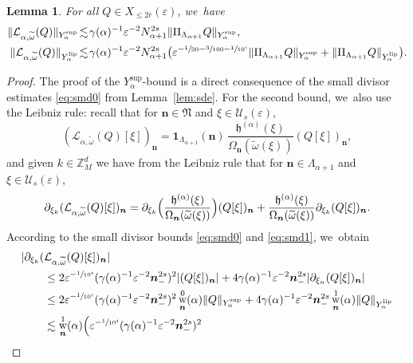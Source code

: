 \documentclass[JEP,XML,SOM,Unicode,published]{cedram}
\DeclareMathOperator{\rw}{w}
\theoremstyle{plain}
\newtheorem{lemma}[theorem]{Lemma}
\theoremstyle{definition}
\newcommand{\nb}{{\boldsymbol n}}
\newcommand{\Nb}{{\boldsymbol{\mathfrak{N}}}}
\newcommand{\Z}{\mathbb{Z}}
\newcommand{\1}{\mathbf{1}}
\newcommand{\Ysup}[1]{Y_{#1}^{\mathrm{sup}}}
\newcommand{\Ylip}[1]{Y_{#1}^{\mathrm{lip}}}
\let\epsilon\varepsilon
\begin{document}
\begin{lemma}
\label{lem:23}
For all $Q\in X_{\leq2\overline{r}}(\epsilon)$, we~have
\begin{align*}
\|\mathcal{L}_{\alpha,\widetilde{\omega}}(Q)\|_{\Ysup{\alpha}}
&\!\lesssim\! \gamma(\alpha)^{-1}\epsilon^{-2}N_{\alpha+1}^{2s}\|\Pi_{\Lambda_{\alpha+1}}Q\|_{\Ysup{\alpha}},\\
\|\mathcal{L}_{\alpha,\widetilde{\omega}}(Q)\|_{\Ylip{\alpha}}
&\!\lesssim\!
\gamma(\alpha)^{-1}
\epsilon^{-2}N_{\alpha+1}^{2s}
\bigl(
\epsilon^{-\sfrac{1}{30}-\sfrac{3}{100}-\sfrac{1}{10^{4}}}\|\Pi_{\Lambda_{\alpha+1}}Q\|_{\Ysup{\alpha}}
+
\|\Pi_{\Lambda_{\alpha+1}}Q\|_{\Ylip{\alpha}}
\bigr).
\end{align*}
\end{lemma}

\begin{proof}
The proof of the $\Ysup{\alpha}$-bound is a direct consequence of the small divisor estimates \eqref{eq:smd0} from Lemma~\ref{lem:sde}. For the second bound, we~also use the Leibniz rule: recall that for $\nb\in\Nb$ and $\xi\in\mathcal{U}_{s}(\epsilon)$,
\[
(
\mathcal{L}_{\alpha,\widetilde{\omega}}(Q)[\xi]
)_{\nb}
=
\mathbf{1}_{\Lambda_{\alpha+1}}(\nb)\,\frac{\mathfrak{h}^{(\alpha)}(\xi)}{\Omega_{\nb}(\widetilde{\omega}(\xi))}(Q[\xi])_{\nb},
\]
and given $k\in\Z_{M}^{d}$ we have from the Leibniz rule that for $\nb\in\Lambda_{\alpha+1}$ and $\xi\in\mathcal{U}_{s}(\epsilon)$,
\[
\partial_{\xi_{k}}(
\mathcal{L}_{\alpha,\widetilde{\omega}}(Q)[\xi]
)_{\nb}
=
\partial_{\xi_{k}}\Bigl(\frac{\mathfrak{h}^{(\alpha)}(\xi)}{\Omega_{\nb}(\widetilde{\omega}(\xi))}\Bigr)(Q[\xi])_{\nb}
+
\frac{\mathfrak{h}^{(\alpha)}(\xi)}{\Omega_{\nb}(\widetilde{\omega}(\xi))}
\partial_{\xi_{k}}(Q[\xi])_{\nb}.
\]
According to the small divisor bounds \eqref{eq:smd0} and \eqref{eq:smd1}, we~obtain
\begin{align*}
|\partial_{\xi_{k}}(&
\mathcal{L}_{\alpha,\widetilde{\omega}}(Q)[\xi]
)_{\nb}
| \\
&\leq
2\epsilon^{-\sfrac{1}{10^{4}}}(\gamma(\alpha)^{-1}\epsilon^{-2}\nb_{-}^{2s})^{2}
|(Q[\xi])_{\nb}|
+
4\gamma(\alpha)^{-1}\epsilon^{-2}\nb_{-}^{2s}
|\partial_{\xi_{n}}(Q[\xi])_{\nb}| \\
&
\leq
2\epsilon^{-\sfrac{1}{10^{4}}}(\gamma(\alpha)^{-1}\epsilon^{-2}\nb_{-}^{2s})^{2}
\rw_{\nb}^{0}(\alpha)\|Q\|_{\Ysup{\alpha}}
+
4\gamma(\alpha)^{-1}\epsilon^{-2}\nb_{-}^{2s}
\rw_{\nb}^{1}(\alpha)\|Q\|_{\Ylip{\alpha}}\\
&\lesssim
\rw_{\nb}^{1}(\alpha)
\Big(
\epsilon^{-\sfrac{1}{10^{4}}}(\gamma(\alpha)^{-1}\epsilon^{-2}\nb_{-}^{2s})^{2}

\end{align*}
\end{proof}
\end{document}
